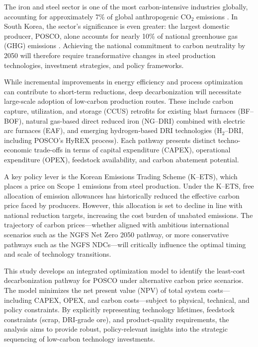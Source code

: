 \documentclass[preprint,5p,authoryear]{elsarticle}
\begin{document}
The iron and steel sector is one of the most carbon-intensive industries globally, accounting for approximately 7\% of global anthropogenic \(\mathrm{CO_2}\) emissions \citep{worldsteel2022}. In South Korea, the sector's significance is even greater: the largest domestic producer, POSCO, alone accounts for nearly 10\% of national greenhouse gas (GHG) emissions \citep{kosis2023}. Achieving the national commitment to carbon neutrality by 2050 will therefore require transformative changes in steel production technologies, investment strategies, and policy frameworks. 

While incremental improvements in energy efficiency and process optimization can contribute to short-term reductions, deep decarbonization will necessitate large-scale adoption of low-carbon production routes. These include carbon capture, utilization, and storage (CCUS) retrofits for existing blast furnaces (BF--BOF), natural gas-based direct reduced iron (NG--DRI) combined with electric arc furnaces (EAF), and emerging hydrogen-based DRI technologies (H$_2$--DRI, including POSCO's HyREX process). Each pathway presents distinct techno-economic trade-offs in terms of capital expenditure (CAPEX), operational expenditure (OPEX), feedstock availability, and carbon abatement potential.

A key policy lever is the Korean Emissions Trading Scheme (K--ETS), which places a price on Scope 1 emissions from steel production. Under the K--ETS, free allocation of emission allowances has historically reduced the effective carbon price faced by producers. However, this allocation is set to decline in line with national reduction targets, increasing the cost burden of unabated emissions. The trajectory of carbon prices—whether aligned with ambitious international scenarios such as the NGFS Net Zero 2050 pathway, or more conservative pathways such as the NGFS NDCs—will critically influence the optimal timing and scale of technology transitions.

This study develops an integrated optimization model to identify the least-cost decarbonization pathway for POSCO under alternative carbon price scenarios. The model minimizes the net present value (NPV) of total system costs—including CAPEX, OPEX, and carbon costs—subject to physical, technical, and policy constraints. By explicitly representing technology lifetimes, feedstock constraints (scrap, DRI-grade ore), and product-quality requirements, the analysis aims to provide robust, policy-relevant insights into the strategic sequencing of low-carbon technology investments.
\end{document}

